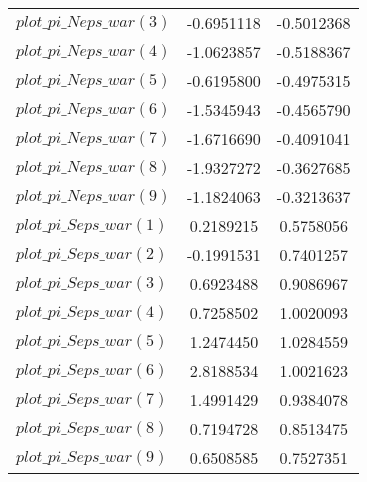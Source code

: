 \begin{center}
\begin{longtable}{lcc}
$plot\_pi\_N eps\_war (3)   $	 & 	     -0.6951118	 & 	     -0.5012368 \\ 
$plot\_pi\_N eps\_war (4)   $	 & 	     -1.0623857	 & 	     -0.5188367 \\ 
$plot\_pi\_N eps\_war (5)   $	 & 	     -0.6195800	 & 	     -0.4975315 \\ 
$plot\_pi\_N eps\_war (6)   $	 & 	     -1.5345943	 & 	     -0.4565790 \\ 
$plot\_pi\_N eps\_war (7)   $	 & 	     -1.6716690	 & 	     -0.4091041 \\ 
$plot\_pi\_N eps\_war (8)   $	 & 	     -1.9327272	 & 	     -0.3627685 \\ 
$plot\_pi\_N eps\_war (9)   $	 & 	     -1.1824063	 & 	     -0.3213637 \\ 
$plot\_pi\_S eps\_war (1)   $	 & 	      0.2189215	 & 	      0.5758056 \\ 
$plot\_pi\_S eps\_war (2)   $	 & 	     -0.1991531	 & 	      0.7401257 \\ 
$plot\_pi\_S eps\_war (3)   $	 & 	      0.6923488	 & 	      0.9086967 \\ 
$plot\_pi\_S eps\_war (4)   $	 & 	      0.7258502	 & 	      1.0020093 \\ 
$plot\_pi\_S eps\_war (5)   $	 & 	      1.2474450	 & 	      1.0284559 \\ 
$plot\_pi\_S eps\_war (6)   $	 & 	      2.8188534	 & 	      1.0021623 \\ 
$plot\_pi\_S eps\_war (7)   $	 & 	      1.4991429	 & 	      0.9384078 \\ 
$plot\_pi\_S eps\_war (8)   $	 & 	      0.7194728	 & 	      0.8513475 \\ 
$plot\_pi\_S eps\_war (9)   $	 & 	      0.6508585	 & 	      0.7527351 \\ 
\end{longtable}
 \end{center}
